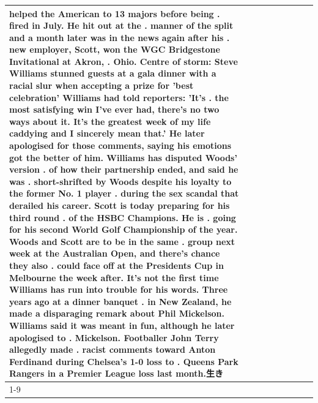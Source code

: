 \begin{table}[H]
\begin{tabular}{lllrlllll}
helped the American to 13 majors before being . fired in July. He hit out at the . manner of the split and a month later was in the news again after his . new employer, Scott, won the WGC Bridgestone Invitational at Akron, . Ohio. Centre of storm: Steve Williams stunned guests at a gala dinner with a racial slur when accepting a prize for 'best celebration' Williams had told reporters: 'It's . the most satisfying win I've ever had, there's no two ways about it. It's the greatest week of my life caddying and I sincerely mean that.' He later apologised for those comments, saying his emotions got the better of him. Williams has disputed Woods' version . of how their partnership ended, and said he was . short-shrifted by Woods despite his loyalty to the former No. 1 player . during the sex scandal that derailed his career. Scott is today preparing for his third round . of the HSBC Champions. He is . going for his second World Golf Championship of the year. Woods and Scott are to be in the same . group next week at the Australian Open, and there's chance they also . could face off at the Presidents Cup in Melbourne the week after. It's not the first time Williams has run into trouble for his words. Three years ago at a dinner banquet . in New Zealand, he made a disparaging remark about Phil Mickelson. Williams said it was meant in fun, although he later apologised to . Mickelson. Footballer John Terry allegedly made . racist comments toward Anton Ferdinand during Chelsea's 1-0 loss to . Queens Park Rangers in a Premier League loss last month.生き \\
\cline{1-9}

\end{tabular}
\end{table}
